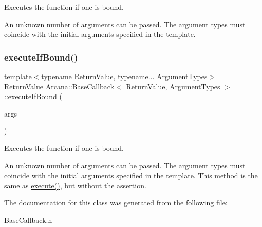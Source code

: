 Executes the function if one is bound. 

An unknown number of arguments can be passed. The argument types must coincide with the initial arguments specified in the template. \mbox{\label{class_arcana_1_1_base_callback_a7ab7b46a89bf248c4ee798e34f1b626d}} 
\subsubsection{\texorpdfstring{execute\+If\+Bound()}{executeIfBound()}}
{\footnotesize\ttfamily template$<$typename Return\+Value, typename... Argument\+Types$>$ \\
Return\+Value \mbox{\hyperlink{class_arcana_1_1_base_callback}{Arcana\+::\+Base\+Callback}}$<$ Return\+Value, Argument\+Types $>$\+::execute\+If\+Bound (\begin{DoxyParamCaption}\item[{Argument\+Types...}]{args }\end{DoxyParamCaption})\hspace{0.3cm}{\ttfamily [inline]}}



Executes the function if one is bound. 

An unknown number of arguments can be passed. The argument types must coincide with the initial arguments specified in the template. This method is the same as \mbox{\hyperlink{class_arcana_1_1_base_callback_ab9cba864f0037c3125ff1b5ea7a33a08}{execute()}}, but without the assertion. 

The documentation for this class was generated from the following file\+:\begin{DoxyCompactItemize}
\item 
Base\+Callback.\+h\end{DoxyCompactItemize}
